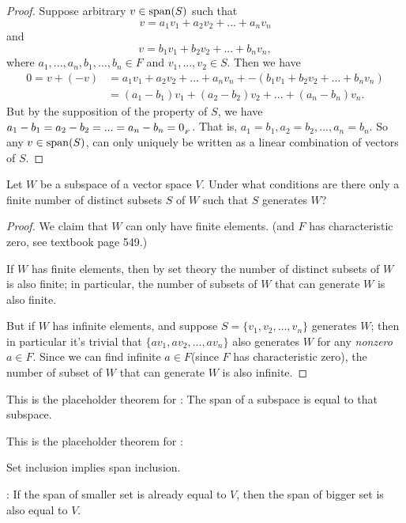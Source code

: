 \begin{proof}
Suppose arbitrary \(v \in \operatorname{span}(S)\) such that
\[
    v = a_1 v_1 + a_2 v_2 + ... + a_n v_n
\]
and
\[
    v = b_1 v_1 + b_2 v_2 + ... + b_n v_n,
\]
where \(a_1, ..., a_n, b_1, ..., b_n \in F\) and \(v_1, ..., v_2 \in S\).
Then we have
\begin{align*}
    0 = v + (-v) & = a_1 v_1 + a_2 v_2 + ... + a_n v_n + -(b_1 v_1 + b_2 v_2 + ... + b_n v_n) \\
                 & = (a_1 - b_1) v_1 + (a_2 - b_2) v_2 + ... + (a_n - b_n) v_n.
\end{align*}
But by the supposition of the property of \(S\), we have \(a_1 - b_1 = a_2 - b_2 = ... = a_n - b_n = 0_{_F}\).
That is, \(a_1 = b_1, a_2 = b_2, ..., a_n = b_n\).
So any \(v \in \operatorname{span}(S)\), can only uniquely be written as a linear combination of vectors of \(S\).
\end{proof}

\begin{exercise} \label{exercise 1.4.17}
Let \(W\) be a subspace of a vector space \(V\).
Under what conditions are there only a finite number of distinct subsets \(S\) of \(W\) such that \(S\) generates \(W\)?
\end{exercise}

\begin{proof}
We claim that \(W\) can only have finite elements. (and \(F\) has characteristic zero, see textbook page 549.)

If \(W\) has finite elements, then by set theory the number of distinct subsets of \(W\) is also finite;
in particular, the number of subsets of \(W\) that can generate \(W\) is also finite.

But if \(W\) has infinite elements, and suppose \(S = \{v_1, v_2, ..., v_n\}\) generates \(W\);
then in particular it's trivial that \(\{a v_1, a v_2, ..., a v_n\}\) also generates \(W\) for any \emph{nonzero} \(a \in F\).
Since we can find infinite \(a \in F\)(since \(F\) has characteristic zero), the number of subset of \(W\) that can generate \(W\) is also infinite.
\end{proof}

\begin{additional theorem} \label{athm 1.11}
This is the placeholder theorem for : The span of a subspace is equal to that subspace.
\end{additional theorem}

\begin{additional theorem} \label{athm 1.12}
This is the placeholder theorem for :

 Set inclusion implies span inclusion.

: If the span of smaller set is already equal to \(V\), then the span of bigger set is also equal to \(V\).
\end{additional theorem}


